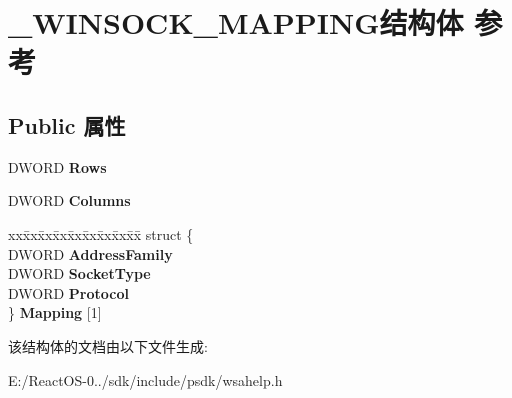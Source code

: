 \hypertarget{struct___w_i_n_s_o_c_k___m_a_p_p_i_n_g}{}\section{\+\_\+\+W\+I\+N\+S\+O\+C\+K\+\_\+\+M\+A\+P\+P\+I\+N\+G结构体 参考}
\label{struct___w_i_n_s_o_c_k___m_a_p_p_i_n_g}
\subsection*{Public 属性}
\begin{DoxyCompactItemize}
\item 
\mbox{\label{struct___w_i_n_s_o_c_k___m_a_p_p_i_n_g_a359d66928723b4081ecfd0006c67725e}} 
D\+W\+O\+RD {\bfseries Rows}
\item 
\mbox{\label{struct___w_i_n_s_o_c_k___m_a_p_p_i_n_g_aca15178a15e21e634ab94711a97613d9}} 
D\+W\+O\+RD {\bfseries Columns}
\item 
\mbox{\label{struct___w_i_n_s_o_c_k___m_a_p_p_i_n_g_a70bdaddaafb531f063b4766480b58114}} 
\begin{tabbing}
xx\=xx\=xx\=xx\=xx\=xx\=xx\=xx\=xx\=\kill
struct \{\\
\>DWORD {\bfseries AddressFamily}\\
\>DWORD {\bfseries SocketType}\\
\>DWORD {\bfseries Protocol}\\
\} {\bfseries Mapping} \mbox{[}1\mbox{]}\\

\end{tabbing}\end{DoxyCompactItemize}


该结构体的文档由以下文件生成\+:\begin{DoxyCompactItemize}
\item 
E\+:/\+React\+O\+S-\/0../sdk/include/psdk/wsahelp.\+h\end{DoxyCompactItemize}
